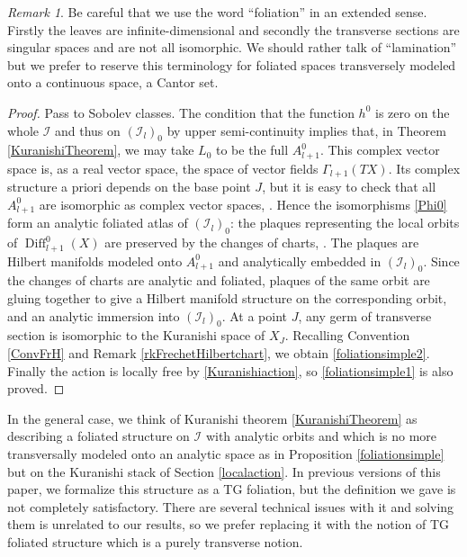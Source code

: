 \documentclass[JEP,XML,SOM,Unicode]{cedram}
\let\mathcal\mathscr
\DeclareMathOperator{\Diff}{Diff}
\theoremstyle{plain}
\theoremstyle{definition}
\theoremstyle{remark}
\newtheorem{remark}[theorem]{Remark}
\numberwithin{equation}{section}
\newcommand{\cI}{\mathcal{I}}
\begin{document}
\begin{remark}
\label{foldef}
Be careful that we use the word ``foliation'' in an extended sense. Firstly the leaves are infinite-dimensional and secondly the transverse sections are singular spaces and are not all isomorphic. We should rather talk of ``lamination'' but we prefer to reserve this terminology for foliated spaces transversely modeled onto a continuous space, \eg a Cantor set.
\end{remark}

\begin{proof}
Pass to Sobolev classes. The condition that the function $h^0$ is zero on the whole $\cI$ and thus on $(\cI_l)_0$ by upper semi-continuity implies that, in Theorem \ref{KuranishiTheorem}, we may take $L_0$ to be the full $A^0_{l+1}$. This complex vector space is, as a real vector space, the space of vector fields $\Gamma_{l+1}(TX)$. Its complex structure a priori depends on the base point $J$, but it is easy to check that all $A^0_{l+1}$ are isomorphic as complex vector spaces, \cite[Lem.\,7.1]{circle}. Hence the isomorphisms \eqref{Phi0} form an analytic foliated atlas of $(\cI_l)_0$: the plaques representing the local orbits of $\Diff^0_{l+1}(X)$ are preserved by the changes of charts, \cf \cite[\S 6]{circle}. The plaques are Hilbert manifolds modeled onto $A^0_{l+1}$ and analytically embedded in $(\cI_l)_0$. Since the changes of charts are analytic and foliated, plaques of the same orbit are gluing together to give a Hilbert manifold structure on the corresponding orbit, and an analytic immersion into $(\cI_l)_0$. At a point $J$, any germ of transverse section is isomorphic to the Kuranishi space of $X_J$. Recalling Convention \ref{ConvFrH} and Remark \ref{rkFrechetHilbertchart}, we obtain \eqref{foliationsimple2}. Finally the action is locally free by \eqref{Kuranishiaction}, so \eqref{foliationsimple1} is also proved.
\end{proof}

In the general case, we think of Kuranishi theorem \ref{KuranishiTheorem} as describing a foliated structure on $\cI$ with analytic orbits and which is no more transversally modeled onto an analytic space as in Proposition \ref{foliationsimple} but on the Kuranishi stack of Section \ref{localaction}. In previous versions of this paper, we formalize this structure as a TG foliation, but the definition we gave is not completely satisfactory. There are several technical issues with it and solving them is unrelated to our results, so we prefer replacing it with the notion of TG foliated structure which is a purely transverse notion.\enlargethispage{-\baselineskip}%
\end{document}
